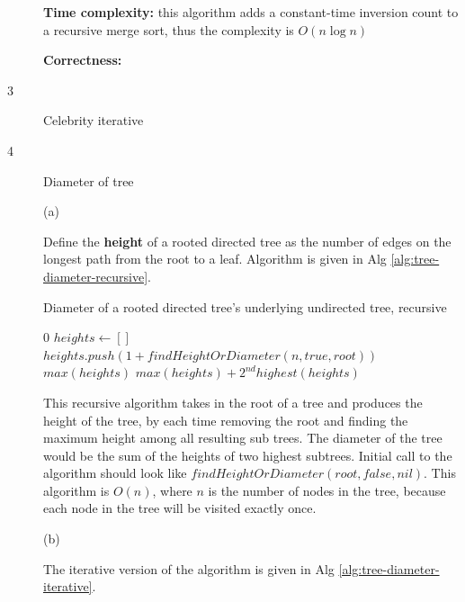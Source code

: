 \documentclass{article}
\begin{document}
\begin{description}
\begin{algorithm}[h]
\begin{algorithmic}[1]
    \end{algorithmic}
  \end{algorithm}
  
  \textbf{Time complexity:} this algorithm adds a constant-time inversion count to a recursive merge sort, thus the complexity is $O(n\log n)$

  \textbf{Correctness:} 

\item[3]{Celebrity iterative}

  

\item[4]{Diameter of tree}
  
  (a)

  Define the \textbf{height} of a rooted directed tree as the number of edges on the longest path from the root to a leaf. Algorithm is given in Alg \ref{alg:tree-diameter-recursive}.

  \begin{algorithm}[h]
  \caption{Diameter of a rooted directed tree's underlying undirected tree, recursive}
  \label{alg:tree-diameter-recursive}
    \begin{algorithmic}[1]
        \State \Return $0$
      \EndIf
      \State $heights \gets []$
        \State $heights.push(1 + findHeightOrDiameter(n, true, root))$
      \EndFor
        \State \Return $max(heights)$
      \Else
        \State \Return $max(heights) + 2^{nd}highest(heights)$
      \EndIf
    \EndFunction
    \end{algorithmic}
  \end{algorithm}

  This recursive algorithm takes in the root of a tree and produces the height of the tree, by each time removing the root and finding the maximum height among all resulting sub trees. The diameter of the tree would be the sum of the heights of two highest subtrees. Initial call to the algorithm should look like $findHeightOrDiameter(root, false, nil)$. This algorithm is $O(n)$, where $n$ is the number of nodes in the tree, because each node in the tree will be visited exactly once.

  (b)

  The iterative version of the algorithm is given in Alg \ref{alg:tree-diameter-iterative}.


\end{description}
\end{document}
